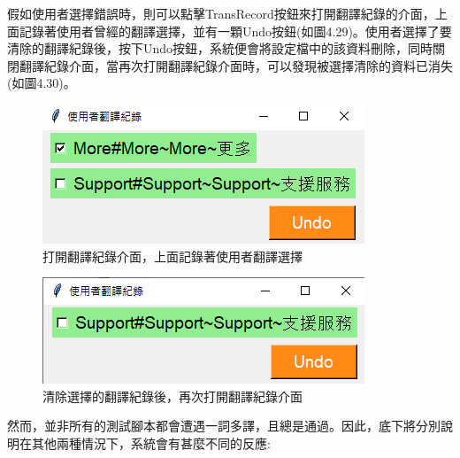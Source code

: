 假如使用者選擇錯誤時，則可以點擊TransRecord按鈕來打開翻譯紀錄的介面，上面記錄著使用者曾經的翻譯選擇，並有一顆Undo按鈕(如圖4.29)。使用者選擇了要清除的翻譯紀錄後，按下Undo按鈕，系統便會將設定檔中的該資料刪除，同時關閉翻譯紀錄介面，當再次打開翻譯紀錄介面時，可以發現被選擇清除的資料已消失(如圖4.30)。

\begin{figure}[H]
\centering
\includegraphics[width= .5\textwidth]{../論文截圖/4-3-4 介面上記錄著使用者翻譯選擇.png}
\caption{打開翻譯紀錄介面，上面記錄著使用者翻譯選擇}
\end{figure}

\begin{figure}[H]
\centering
\includegraphics[width= .5\textwidth]{../論文截圖/4-3-5 將選擇的翻譯清除後，再次打開翻譯紀錄介面.png}
\caption{清除選擇的翻譯紀錄後，再次打開翻譯紀錄介面}
\end{figure}

然而，並非所有的測試腳本都會遭遇一詞多譯，且總是通過。因此，底下將分別說明在其他兩種情況下，系統會有甚麼不同的反應:

